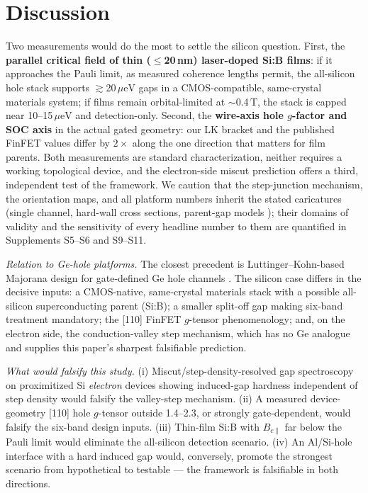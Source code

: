 \documentclass[11pt]{article}
\newcommand{\ueV}{\,\mu\mathrm{eV}}
\begin{document}
\section{Discussion}
Two measurements would do the most to settle the silicon question. First, the \textbf{parallel critical
field of thin ($\le$20\,nm) laser-doped Si:B films}: if it approaches the Pauli limit,
as measured coherence lengths permit, the all-silicon hole stack supports
$\gtrsim$20$\ueV$ gaps in a CMOS-compatible, same-crystal materials system; if films
remain orbital-limited at $\sim$0.4\,T, the stack is capped near 10--15$\ueV$ and
detection-only. Second, the \textbf{wire-axis hole $g$-factor and SOC axis} in the
actual gated geometry: our LK bracket and the published FinFET values differ by
$2\times$ along the one direction that matters for film parents. Both measurements are
standard characterization, neither requires a working topological device, and the
electron-side miscut prediction offers a third, independent test of the framework. We
caution that the step-junction mechanism, the orientation maps, and all platform
numbers inherit the stated caricatures (single channel, hard-wall cross
sections, parent-gap models \cite{nijholt}); their domains of validity and the sensitivity of every headline number to them are
quantified in Supplements S5--S6 and S9--S11.

\emph{Relation to Ge-hole platforms.} The closest precedent is
Luttinger--Kohn-based Majorana design for gate-defined Ge hole channels
\cite{gehole}. The silicon case differs in the decisive inputs: a
CMOS-native, same-crystal materials stack with a possible all-silicon
superconducting parent (Si:B); a smaller split-off gap making six-band
treatment mandatory; the [110] FinFET $g$-tensor phenomenology; and, on
the electron side, the conduction-valley step mechanism, which has no Ge
analogue and supplies this paper's sharpest falsifiable prediction.

\emph{What would falsify this study.} (i) Miscut/step-density-resolved gap
spectroscopy on proximitized Si \emph{electron} devices showing induced-gap
hardness independent of step density would falsify the valley-step
mechanism. (ii) A measured device-geometry [110] hole $g$-tensor outside
1.4--2.3, or strongly gate-dependent, would falsify the six-band design
inputs. (iii) Thin-film Si:B with $B_{c\parallel}$ far below the Pauli
limit would eliminate the all-silicon detection scenario. (iv) An Al/Si-hole
interface with a hard induced gap would, conversely, promote the strongest
scenario from hypothetical to testable --- the framework is falsifiable in
both directions.
\end{document}
